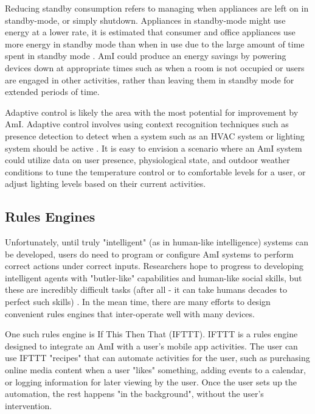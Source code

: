 \documentclass{article}
\begin{document}
Reducing standby consumption refers to managing when appliances are left on in standby-mode, or simply shutdown. Appliances in standby-mode might use energy at a lower rate, it is estimated that consumer and office appliances use more energy in standby mode than when in use due to the large amount of time spent in standby mode \cite{DePaola:2014:IMS:2620784.2611779}. AmI could produce an energy savings by powering devices down at appropriate times such as when a room is not occupied or users are engaged in other activities, rather than leaving them in standby mode for extended periods of time.

Adaptive control is likely the area with the most potential for improvement by AmI. Adaptive control involves using context recognition techniques such as presence detection to detect when a system such as an HVAC system or lighting system should be active \cite{DePaola:2014:IMS:2620784.2611779}. It is easy to envision a scenario where an AmI system could utilize data on user presence, physiological state, and outdoor weather conditions to tune the temperature control or to comfortable levels for a user, or adjust lighting levels based on their current activities.

%
\subsection{Rules Engines}
Unfortunately, until truly "intelligent" (as in human-like intelligence) systems can be developed, users do need to program or configure AmI systems to perform correct actions under correct inputs. Researchers hope to progress to developing intelligent agents with "butler-like" capabilities and human-like social skills, but these are incredibly difficult tasks (after all - it can take humans decades to perfect such skills) \cite{Cook2009277} \cite{Cook:2007:SOE:1225943.1226005}. In the mean time, there are many efforts to design convenient rules engines that inter-operate well with many devices.

One such rules engine is If This Then That (IFTTT). IFTTT is a rules engine designed to integrate an AmI with a user's mobile app activities. The user can use IFTTT "recipes" that can automate activities for the user, such as purchasing online media content when a user "likes" something, adding events to a calendar, or logging information for later viewing by the user. Once the user sets up the automation, the rest happens "in the background", without the user's intervention. \cite{ifttt}
\end{document}
